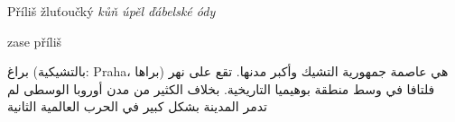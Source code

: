 \documentclass{article}
\begin{document}
Příliš žluťoučký \textit{kůň úpěl ďábelské ódy}

\pokus zase příliš

\amiri 
براغ (بالتشيكية: Praha، براها) هي عاصمة جمهورية التشيك وأكبر مدنها. تقع على نهر فلتافا في وسط منطقة بوهيميا التاريخية. بخلاف الكثير من مدن أوروبا الوسطى لم تدمر المدينة بشكل كبير في الحرب العالمية الثانية 
\end{document}
